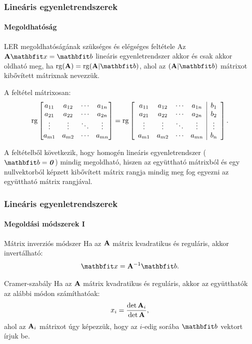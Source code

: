 \documentclass[xcolor={table}]{beamer}
\begin{document}
\begin{frame}
  \frametitle{Lineáris egyenletrendszerek}
  \framesubtitle{Megoldhatóság}

  \vspace{-7.5mm}
  \begin{block}{LER megoldhatóságának szükséges és elégséges feltétele}
    Az $\rmat A \rvec x = \rvec b$ lineáris egyenletrendszer akkor és csak
    akkor oldható meg, ha $\rg(\rmat A) = \rg(\rmat A | \rvec b)$, ahol az
    $(\rmat A | \rvec b)$ mátrixot kibővített mátrixnak nevezzük.

    A feltétel mátrixosan:
    \[
      \operatorname{rg} \begin{bmatrix}
        a_{11} & a_{12} & \cdots & a_{1n} \\
        a_{21} & a_{22} & \cdots & a_{2n} \\
        \vdots & \vdots & \ddots & \vdots \\
        a_{m1} & a_{m2} & \cdots & a_{mn}
      \end{bmatrix} = \operatorname{rg} \left[\begin{array}{cccc|c}
          a_{11} & a_{12} & \cdots & a_{1n} & b_1    \\
          a_{21} & a_{22} & \cdots & a_{2n} & b_2    \\
          \vdots & \vdots & \ddots & \vdots & \vdots \\
          a_{m1} & a_{m2} & \cdots & a_{mn} & b_n
        \end{array}\right]\text.
    \]

    A feltételből következik, hogy homogén lineáris egyenletrendszer
    ($\rvec b = \nvec$) mindig megoldható, hiszen az együttható mátrixból és egy
    nullvektorból képzett kibővített mátrix rangja mindig meg fog egyezni az
    együttható mátrix rangjával.
  \end{block}
\end{frame}

\begin{frame}
  \frametitle{Lineáris egyenletrendszerek}
  \framesubtitle{Megoldási módszerek I}

  \begin{block}{Mátrix inverziós módszer}
    Ha az $\mathbf{A}$ mátrix kvadratikus és reguláris, akkor invertálható:
    \[
      \rvec x = \rmat A^{-1} \rvec b
      \text.
    \]
  \end{block}

  \begin{block}{Cramer-szabály}
    Ha az $\mathbf{A}$ mátrix kvadratikus és reguláris, akkor az együtthatók az
    alábbi módon számíthatóak:
    \[
      x_i = \frac{\det \mathbf{A}_i}{\det \mathbf{A}}
      \text,
    \]
    ahol az $\mathbf{A}_i$ mátrixot úgy képezzük, hogy az $i$-edig sorába
    $\rvec b$ vektort írjuk be.
  \end{block}
\end{frame}
\end{document}
